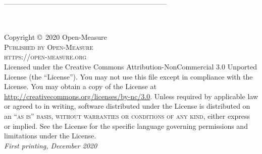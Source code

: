 \documentclass[11pt,fleqn]{book} %
\begin{document}
	
---------------------------------------------------------------------

\begingroup
\thispagestyle{empty} %
\vfill
\endgroup


\newpage
~\vfill
\thispagestyle{empty}

\noindent Copyright \copyright\ 2020 Open-Measure\\ %

\noindent \textsc{Published by Open-Measure}\\ %

\noindent \textsc{https://open-measure.org}\\ %

\noindent Licensed under the Creative Commons Attribution-NonCommercial 3.0 Unported License (the ``License''). You may not use this file except in compliance with the License. You may obtain a copy of the License at \url{http://creativecommons.org/licenses/by-nc/3.0}. Unless required by applicable law or agreed to in writing, software distributed under the License is distributed on an \textsc{``as is'' basis, without warranties or conditions of any kind}, either express or implied. See the License for the specific language governing permissions and limitations under the License.\\ %

\noindent \textit{First printing, December 2020} %
\end{document}
